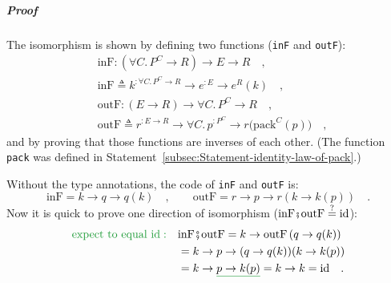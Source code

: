\subparagraph{Proof}

The isomorphism is shown by defining two functions (\lstinline!inF!
and \lstinline!outF!):
\begin{align*}
 & \text{inF}:(\forall C.\,P^{C}\rightarrow R)\rightarrow E\rightarrow R\quad,\\
 & \text{inF}\triangleq k^{:\forall C.\,P^{C}\rightarrow R}\rightarrow e^{:E}\rightarrow e^{R}(k)\quad,\\
 & \text{outF}:(E\rightarrow R)\rightarrow\forall C.\,P^{C}\rightarrow R\quad,\\
 & \text{outF}\triangleq r^{:E\rightarrow R}\rightarrow\forall C.\,p^{:P^{C}}\rightarrow r\big(\text{pack}^{C}(p)\big)\quad,
\end{align*}
and by proving that those functions are inverses of each other. (The
function \lstinline!pack! was defined in Statement~\ref{subsec:Statement-identity-law-of-pack}.)

Without the type annotations, the code of \lstinline!inF! and \lstinline!outF!
is:
\[
\text{inF}=k\rightarrow q\rightarrow q(k)\quad,\quad\quad\text{outF}=r\rightarrow p\rightarrow r(k\rightarrow k(p))\quad.
\]
Now it is quick to prove one direction of isomorphism ($\text{inF}\bef\text{outF}\overset{?}{=}\text{id}$):
\begin{align*}
{\color{greenunder}\text{expect to equal }\text{id}:}\quad & \text{inF}\bef\text{outF}=k\rightarrow\text{outF}\,(q\rightarrow q(k))\\
 & =k\rightarrow p\rightarrow(q\rightarrow q(k))(k\rightarrow k(p))\\
 & =k\rightarrow\gunderline{p\rightarrow k(p)}=k\rightarrow k=\text{id}\quad.
\end{align*}


